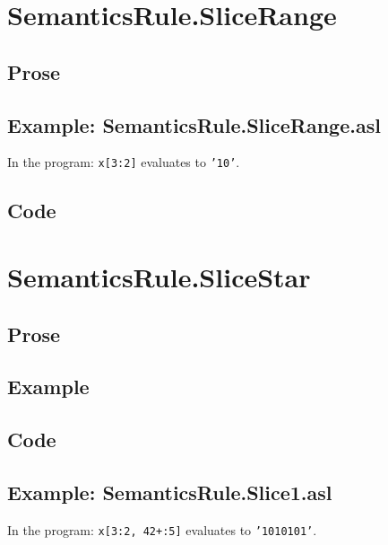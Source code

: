 \documentclass{book}
\begin{document}
\section{SemanticsRule.SliceRange \label{sec:SemanticsRule.SliceRange}}

  \subsection{Prose}

  \subsection{Example: SemanticsRule.SliceRange.asl}
  In the program:
  \texttt{x[3:2]} evaluates to \texttt{'10'}.

  \subsection{Code}

\section{SemanticsRule.SliceStar \label{sec:SemanticsRule.SliceStar}}

  \subsection{Prose}

  \subsection{Example}

  \subsection{Code}

  \subsection{Example: SemanticsRule.Slice1.asl}
  In the program:
  \texttt{x[3:2, 42+:5]} evaluates to \texttt{'1010101'}.
\end{document}
